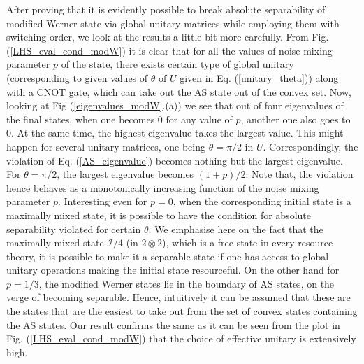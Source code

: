    
After proving that it is evidently possible to break absolute separability of modified Werner state via global unitary matrices while employing them with switching order, we look at the results a little bit more carefully. From Fig. (\ref{LHS_eval_cond_modW}) it is clear that for all the values of noise mixing parameter $p$ of the state, there exists certain type of global unitary (corresponding to given values of $\theta$ of $U$ given in Eq. (\ref{unitary_theta})) along with a CNOT gate, which can take out the AS state out of the convex set. Now, looking at Fig (\ref{eigenvalues_modW}.(a)) we see that out of four eigenvalues of the final states, when one becomes $0$ for any value of $p$, another one also goes to $0$. At the same time, the highest eigenvalue takes the largest value. This might happen for several unitary matrices, one being $\theta=\pi/2$ in $U$. Correspondingly, the violation of Eq. (\ref{AS_eigenvalue}) becomes nothing but the largest eigenvalue. For $\theta=\pi/2$, the largest eigenvalue becomes $(1+p)/2$. Note that, the violation hence behaves as a monotonically increasing function of the noise mixing parameter $p$. Interesting even for $p=0$, when the corresponding initial state is a maximally mixed state, it is possible to have the condition for absolute separability violated for certain $\theta$. We emphasise here on the fact that the maximally mixed state $\mathcal{I}/4$ (in $2\otimes2$), which is a free state in every resource theory, it is possible to make it a separable state if one has access to global unitary operations making the initial state resourceful. On the other hand for $p=1/3$, the modified Werner states lie in the boundary of AS states, on the verge of becoming separable. Hence, intuitively it can be assumed that these are the states that are the easiest to take out from the set of convex states containing the AS states. Our result confirms the same as it can be seen from the plot in Fig. (\ref{LHS_eval_cond_modW}) that the choice of effective unitary is extensively high. 

